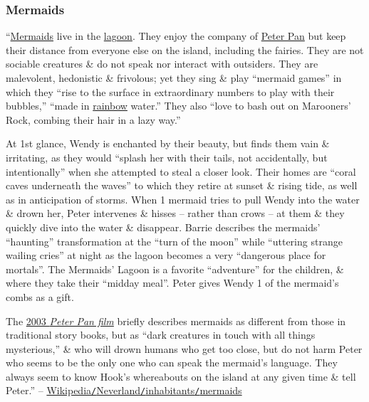 \documentclass[oneside]{book}
\numberwithin{equation}{section}
\begin{document}
\subsubsection{Mermaids}
``\href{https://en.wikipedia.org/wiki/Mermaid}{Mermaids} live in the \href{https://en.wikipedia.org/wiki/Lagoon}{lagoon}. They enjoy the company of \href{https://en.wikipedia.org/wiki/Peter_Pan}{Peter Pan} but keep their distance from everyone else on the island, including the fairies. They are not sociable creatures \& do not speak nor interact with outsiders. They are malevolent, hedonistic \& frivolous; yet they sing \& play ``mermaid games'' in which they ``rise to the surface in extraordinary numbers to play with their bubbles,'' ``made in \href{https://en.wikipedia.org/wiki/Rainbow}{rainbow} water.'' They also ``love to bash out on Marooners' Rock, combing their hair in a lazy way.''

At 1st glance, Wendy is enchanted by their beauty, but finds them vain \& irritating, as they would ``splash her with their tails, not accidentally, but intentionally'' when she attempted to steal a closer look. Their homes are ``coral caves underneath the waves'' to which they retire at sunset \& rising tide, as well as in anticipation of storms. When 1 mermaid tries to pull Wendy into the water \& drown her, Peter intervenes \& hisses -- rather than crows -- at them \& they quickly dive into the water \& disappear. Barrie describes the mermaids' ``haunting'' transformation at the ``turn of the moon'' while ``uttering strange wailing cries'' at night as the lagoon becomes a very ``dangerous place for mortals''. The Mermaids' Lagoon is a favorite ``adventure'' for the children, \& where they take their ``midday meal''. Peter gives Wendy 1 of the mermaid's combs as a gift.

The \href{https://en.wikipedia.org/wiki/Peter_Pan_(2003_film)}{2003 \textit{Peter Pan film}} briefly describes mermaids as different from those in traditional story books, but as ``dark creatures in touch with all things mysterious,'' \& who will drown humans who get too close, but do not harm Peter who seems to be the only one who can speak the mermaid's language. They always seem to know Hook's whereabouts on the island at any given time \& tell Peter.'' -- \href{https://en.wikipedia.org/wiki/Neverland#Mermaids}{Wikipedia\texttt{/}Neverland\texttt{/}inhabitants\texttt{/}mermaids}
\end{document}
